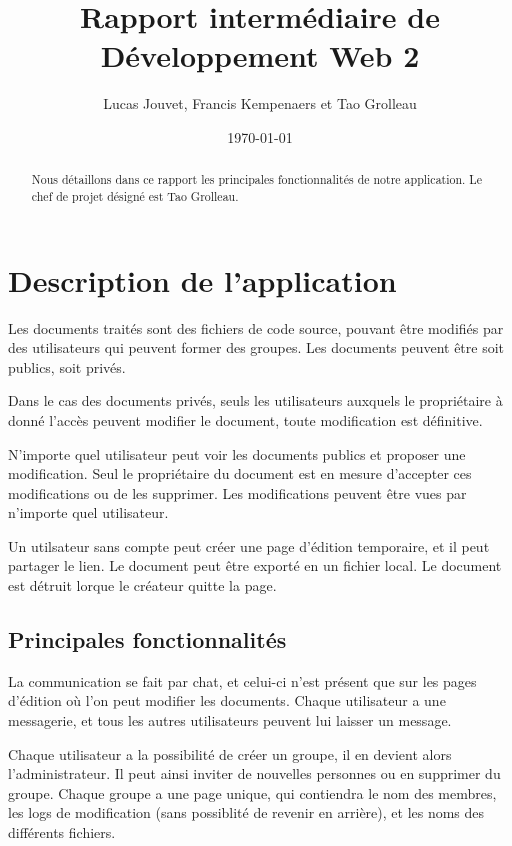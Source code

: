 \documentclass[a4paper, 12pt]{article}
\title{Rapport intermédiaire de Développement Web 2}
\author{Lucas Jouvet, Francis Kempenaers et Tao Grolleau}
\date{\today}
\begin{document}
\maketitle

\begin{abstract}
  Nous détaillons dans ce rapport les principales fonctionnalités de notre application. Le chef de projet désigné est Tao Grolleau.
\end{abstract}

\newpage

\section{Description de l'application}

Les documents traités sont des fichiers de code source, pouvant être modifiés par des utilisateurs qui peuvent former des groupes. Les documents peuvent être soit publics, soit privés. 

Dans le cas des documents privés, seuls les utilisateurs auxquels le propriétaire à donné l'accès peuvent modifier le document, toute modification est définitive. 

N'importe quel utilisateur peut voir les documents publics et proposer une modification. Seul le propriétaire du document est en mesure d'accepter ces modifications ou de les supprimer. Les modifications peuvent être vues par n'importe quel utilisateur.

Un utilsateur sans compte peut créer une page d'édition temporaire, et il peut partager le lien. Le document peut être exporté en un fichier local. Le document est détruit lorque le créateur quitte la page.

\subsection{Principales fonctionnalités}

La communication se fait par chat, et celui-ci n'est présent que sur les pages d'édition où l'on peut modifier les documents. Chaque utilisateur a une messagerie, et tous les autres utilisateurs peuvent lui laisser un message.

Chaque utilisateur a la possibilité de créer un groupe, il en devient alors l'administrateur. Il peut ainsi inviter de nouvelles personnes ou en supprimer du groupe. Chaque groupe a une page unique, qui contiendra le nom des membres, les logs de modification (sans possiblité de revenir en arrière), et les noms des différents fichiers.
\end{document}
